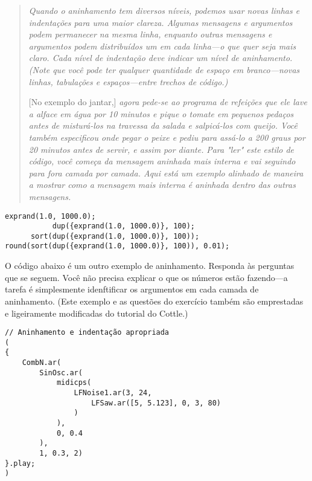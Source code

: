 \begin{quotation}
\textit{Quando o aninhamento tem diversos níveis, podemos usar novas linhas e indentações para uma maior clareza. Algumas mensagens e argumentos podem permanecer na mesma linha, enquanto outras mensagens e argumentos podem distribuídos um em cada linha---o que quer seja mais claro. Cada nível de indentação deve indicar um nível de aninhamento. (Note que você pode ter qualquer quantidade de espaço em branco---novas linhas, tabulações e espaços---entre trechos de código.)}

[No exemplo do jantar,]\textit{ agora pede-se ao programa de refeições que ele lave a alface em água por 10 minutos e pique o tomate em pequenos pedaços antes de misturá-los na travessa da salada e salpicá-los com queijo. Você também especificou onde pegar o peixe e pediu para assá-lo a 200 graus por 20 minutos antes de servir, e assim por diante.} 
\textit{Para "ler" este estilo de código, você começa da mensagem aninhada mais interna e vai seguindo para fora camada por camada. Aqui está um exemplo alinhado de maneira a mostrar como a mensagem mais interna é aninhada dentro das outras mensagens.}
\end{quotation}

%

\begin{lstlisting}[style=SuperCollider-IDE, basicstyle=\scttfamily\footnotesize]
                exprand(1.0, 1000.0);
           dup({exprand(1.0, 1000.0)}, 100);
      sort(dup({exprand(1.0, 1000.0)}, 100));
round(sort(dup({exprand(1.0, 1000.0)}, 100)), 0.01);
\end{lstlisting}

O código abaixo é um outro exemplo de aninhamento. Responda às perguntas que se seguem. Você não precisa explicar o que os números estão fazendo---a tarefa é simplesmente idenftificar os argumentos em cada camada de aninhamento. (Este exemplo e as questões do exercício também são emprestadas e ligeiramente modificadas do tutorial do Cottle.)

 
%

\begin{lstlisting}[style=SuperCollider-IDE, basicstyle=\scttfamily\footnotesize]
// Aninhamento e indentação apropriada
(
{
	CombN.ar(
		SinOsc.ar(
			midicps(
				LFNoise1.ar(3, 24,
					LFSaw.ar([5, 5.123], 0, 3, 80)
				)
			),
			0, 0.4
		),
		1, 0.3, 2)
}.play;
)
\end{lstlisting}

